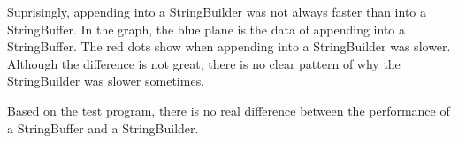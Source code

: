 Suprisingly, appending into a StringBuilder was not always faster than into a StringBuffer. In the graph, the blue plane is the data of appending into a StringBuffer. The red dots show when appending into a StringBuilder was slower. Although the difference is not great, there is no clear pattern of why the StringBuilder was slower sometimes.

\begin{figure}[H]\centering
\begin{framed}
\end{framed}
\label{fig:stringbuildervsStringBuffer}
\end{figure}

Based on the test program, there is no real difference between the performance of a StringBuffer and a StringBuilder.
